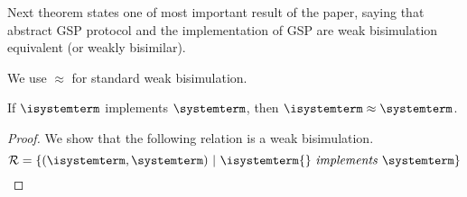 \begin{definition}
\begin{enumerate}
\end{enumerate}
 
	
	
\end{definition}

Next theorem states one of most important result of the paper, saying that abstract GSP protocol and the implementation of GSP are weak bisimulation equivalent (or weakly bisimilar).

We use $\approx$ for standard weak bisimulation.

\begin{theorem} If  $\isystemterm$ implements $\systemterm$, then $\isystemterm\approx\systemterm$. 
\end{theorem}



\begin{proof} We show that the following relation is a weak bisimulation.
\[
\mathcal{R} = \{ (\isystemterm, \systemterm) \ |\ \implements{\isystemterm{}}{\systemterm} \}
\]





\end{proof}

